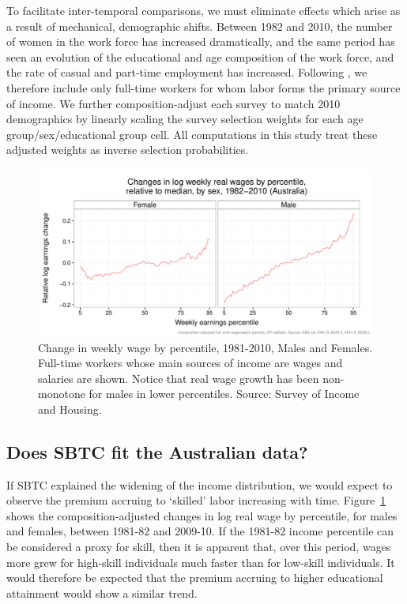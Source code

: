 \documentclass[a4paper,11pt,notitlepage]{article}
\begin{document}
To facilitate inter-temporal comparisons, we must eliminate effects which arise as a result of mechanical, demographic shifts. Between 1982 and 2010, the number of women in the work force has increased dramatically, and the same period has seen an evolution of the educational and age composition of the work force, and the rate of casual and part-time employment has increased. Following \citet{Acemoglu2011}, we therefore include only full-time workers for whom labor forms the primary source of income. We further composition-adjust each survey to match 2010 demographics by linearly scaling the survey selection weights for each age group/sex/educational group cell. All computations in this study treat these adjusted weights as inverse selection probabilities.

\begin{figure}
  \centering
  \includegraphics[width=\textwidth]{../figure/quantile_mf.pdf}
  \caption{Change in weekly wage by percentile, 1981-2010, Males and Females. Full-time workers whose main sources of income are wages and salaries are shown. Notice that real wage growth has been non-monotone for males in lower percentiles. Source: Survey of Income and Housing.}
  \label{fig:banana}
\end{figure}

\subsection{Does SBTC fit the Australian data?}

If SBTC explained the widening of the income distribution, we would expect to observe the premium accruing to `skilled' labor increasing with time. Figure~\ref{fig:banana} shows the composition-adjusted changes in log real wage by percentile, for males and females, between 1981-82 and 2009-10. If the 1981-82 income percentile can be considered a proxy for skill, then it is apparent that, over this period, wages more grew for high-skill individuals much faster than for low-skill individuals. It would therefore be expected that the premium accruing to higher educational attainment would show a similar trend.
\end{document}
